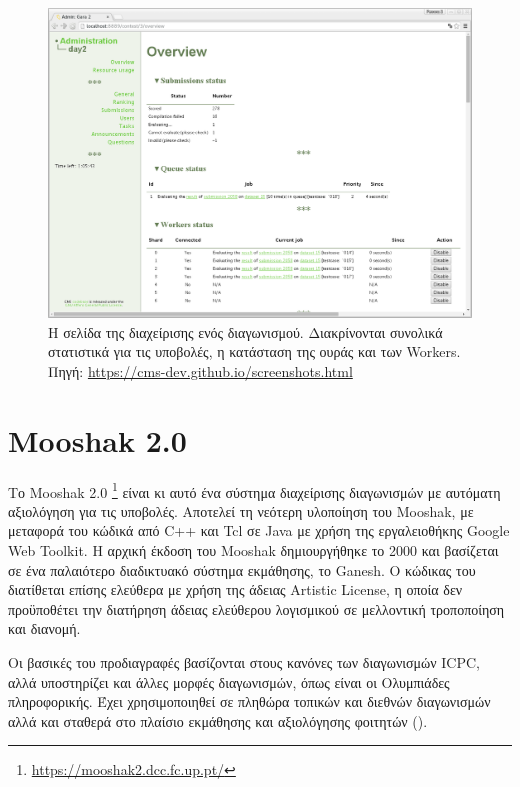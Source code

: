 \documentclass[diploma]{softlab-thesis}
\begin{document}
\begin{figure}
  \centering
  \includegraphics[scale=0.3,trim=4 4 4 4,clip]{Figures/cmsadmin.png}
  \caption[Σελίδα διαχείρισης διαγωνισμού CMS]{Η σελίδα της διαχείρισης ενός
  διαγωνισμού. Διακρίνονται συνολικά στατιστικά για τις υποβολές, η κατάσταση
  της ουράς και των Workers. Πηγή: \url{https://cms-dev.github.io/screenshots.html}}
\end{figure}

\FloatBarrier

\section{Mooshak 2.0}

Το Mooshak 2.0 \footnote{\url{https://mooshak2.dcc.fc.up.pt/}} είναι κι αυτό ένα
σύστημα διαχείρισης διαγωνισμών με αυτόματη αξιολόγηση για τις υποβολές.
Αποτελεί τη νεότερη υλοποίηση του Mooshak, με μεταφορά του κώδικά από C++ και
Tcl σε Java με χρήση της εργαλειοθήκης Google Web Toolkit. H αρχική έκδοση του
Mooshak δημιουργήθηκε το 2000 και βασίζεται σε ένα παλαιότερο διαδικτυακό
σύστημα εκμάθησης, το Ganesh. Ο κώδικας του διατίθεται επίσης ελεύθερα με χρήση
της άδειας Artistic License, η οποία δεν προϋποθέτει την διατήρηση άδειας
ελεύθερου λογισμικού σε μελλοντική τροποποίηση και διανομή.

\bigskip

Οι βασικές του προδιαγραφές βασίζονται στους κανόνες των διαγωνισμών ICPC, αλλά
υποστηρίζει και άλλες μορφές διαγωνισμών, όπως είναι οι Ολυμπιάδες πληροφορικής.
Έχει χρησιμοποιηθεί σε πληθώρα τοπικών και διεθνών διαγωνισμών αλλά και σταθερά
στο πλαίσιο εκμάθησης και αξιολόγησης φοιτητών (\cite{leal2008using}).
\end{document}
